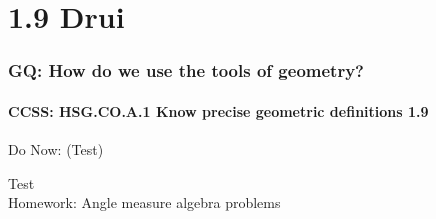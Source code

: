 \documentclass{beamer}
\begin{document}
  \section{1.9 Drui}
    \frame
    {
      \frametitle{GQ: How do we use the tools of geometry?}
      \framesubtitle{CCSS: HSG.CO.A.1 Know precise geometric definitions  \alert{1.9}}

      \begin{block}{Do Now: (Test)}
      \end{block}
      Test\\
      \vspace{1cm}
      Homework: Angle measure algebra problems
    }
\end{document}
